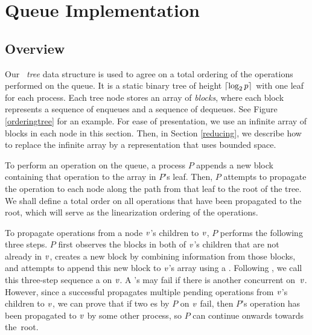 
\section{Queue Implementation} \label{DescriptQ}

\subsection{Overview}
Our \emph{\ordering\ tree} data structure is used to agree on a total ordering of the operations performed on the queue.
It is a static binary tree of height $\lceil \log_2 p \rceil$ with one leaf 
for each process. 
Each tree node  stores an array of \emph{blocks}, where each block represents a 
sequence of enqueues and a sequence of dequeues.
See Figure \ref{orderingtree} for an example.
For ease of presentation,
we use an infinite array of blocks in each node in this section.
Then, in Section \ref{reducing}, we describe how to replace the infinite array by a representation that uses bounded space.

To perform an operation on the queue, a process $P$ appends a new block containing that  
operation to the  array in $P$'s leaf.
Then, $P$ attempts to propagate the operation to each node along the path from that leaf to the root of the tree.
We shall define a total order on all operations that have been propagated to the root, which 
will serve as the linearization ordering of the operations.

To propagate operations from a node $\mbox{\textnormal{\textit{v}}}$'s children to $\mbox{\textnormal{\textit{v}}}$, $P$ performs the following
three steps.
$P$ first observes
the blocks in both of $\mbox{\textnormal{\textit{v}}}$'s children that are not already in $\mbox{\textnormal{\textit{v}}}$,
creates a new block by combining information from those blocks, and attempts to append this 
new block to $\mbox{\textnormal{\textit{v}}}$'s  array using a .
Following \cite{DBLP:conf/fsttcs/JayantiP05}, we call this three-step sequence a
 on $\mbox{\textnormal{\textit{v}}}$. %
A 's  may fail if there is another concurrent  on~$\mbox{\textnormal{\textit{v}}}$.
However, since a successful  propagates multiple pending operations 
from $\mbox{\textnormal{\textit{v}}}$'s children to $\mbox{\textnormal{\textit{v}}}$,
we can prove that if two es by $P$ on $\mbox{\textnormal{\textit{v}}}$ fail,
then $P$'s operation has been propagated to $\mbox{\textnormal{\textit{v}}}$ by some other process, so $P$ can continue 
onwards towards the~root.

